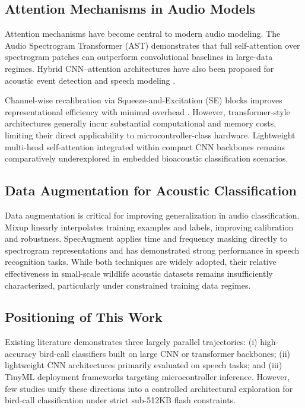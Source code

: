 \documentclass[final,5p,times,twocolumn,nolinenum]{elsarticle}
\begin{document}
\subsection{Attention Mechanisms in Audio Models}

Attention mechanisms have become central to modern audio modeling. The Audio Spectrogram Transformer (AST) \cite{gong2021ast} demonstrates that full self-attention over spectrogram patches can outperform convolutional baselines in large-data regimes. Hybrid CNN--attention architectures have also been proposed for acoustic event detection and speech modeling \cite{kong2020panns}.

Channel-wise recalibration via Squeeze-and-Excitation (SE) blocks improves representational efficiency with minimal overhead \cite{hu2018squeeze}. However, transformer-style architectures generally incur substantial computational and memory costs, limiting their direct applicability to microcontroller-class hardware. Lightweight multi-head self-attention integrated within compact CNN backbones remains comparatively underexplored in embedded bioacoustic classification scenarios.

\subsection{Data Augmentation for Acoustic Classification}

Data augmentation is critical for improving generalization in audio classification. Mixup \cite{zhang2018mixup} linearly interpolates training examples and labels, improving calibration and robustness. SpecAugment \cite{park2019specaugment} applies time and frequency masking directly to spectrogram representations and has demonstrated strong performance in speech recognition tasks. While both techniques are widely adopted, their relative effectiveness in small-scale wildlife acoustic datasets remains insufficiently characterized, particularly under constrained training data regimes.

\subsection{Positioning of This Work}

Existing literature demonstrates three largely parallel trajectories: (i) high-accuracy bird-call classifiers built on large CNN or transformer backbones; (ii) lightweight CNN architectures primarily evaluated on speech tasks; and (iii) TinyML deployment frameworks targeting microcontroller inference. However, few studies unify these directions into a controlled architectural exploration for bird-call classification under strict sub-512KB flash constraints.
\end{document}
